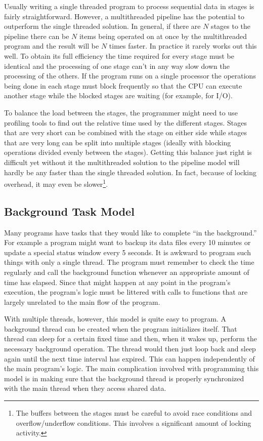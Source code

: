 Usually writing a single threaded program to process sequential data in stages is fairly
straightforward. However, a multithreaded pipeline has the potential to outperform the single
threaded solution. In general, if there are $N$ stages to the pipeline there can be $N$ items
being operated on at once by the multithreaded program and the result will be $N$ times faster.
In practice it rarely works out this well. To obtain its full efficiency the time required for
every stage must be identical and the processing of one stage can't in any way slow down the
processing of the others. If the program runs on a single processor the operations being done in
each stage must block frequently so that the CPU can execute another stage while the blocked
stages are waiting (for example, for I/O).

To balance the load between the stages, the programmer might need to use profiling tools to find
out the relative time used by the different stages. Stages that are very short can be combined
with the stage on either side while stages that are very long can be split into multiple stages
(ideally with blocking operations divided evenly between the stages). Getting this balance just
right is difficult yet without it the multithreaded solution to the pipeline model will hardly
be any faster than the single threaded solution. In fact, because of locking overhead, it may
even be slower\footnote{The buffers between the stages must be careful to avoid race conditions
  and overflow/underflow conditions. This involves a significant amount of locking activity.}.

\subsection{Background Task Model}
\label{subsec:background-model}

Many programs have tasks that they would like to complete ``in the background.'' For example a
program might want to backup its data files every 10 minutes or update a special status window
every 5 seconds. It is awkward to program such things with only a single thread. The program
must remember to check the time regularly and call the background function whenever an
appropriate amount of time has elapsed. Since that might happen at any point in the program's
execution, the program's logic must be littered with calls to functions that are largely
unrelated to the main flow of the program.

With multiple threads, however, this model is quite easy to program. A background thread can be
created when the program initializes itself. That thread can sleep for a certain fixed time and
then, when it wakes up, perform the necessary background operation. The thread would then just
loop back and sleep again until the next time interval has expired. This can happen
independently of the main program's logic. The main complication involved with programming this
model is in making sure that the background thread is properly synchronized with the main thread
when they access shared data.

